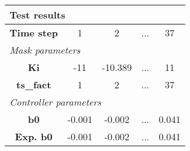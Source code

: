 \vspace{1em}
\begin{tabularx}{\textwidth}{|c|c|c|>{\centering\arraybackslash}X|c|}
\hline
\multicolumn{5}{|l|}{\cellcolor[gray]{0.8}\textbf{Test results}} \tabularnewline \hline
\textbf{Time step} & 1 & 2 & ... & 37 \tabularnewline \hline
\multicolumn{5}{|l|}{\cellcolor[gray]{0.9}\textit{Mask parameters}} \tabularnewline \hline
\textbf{Ki} & -11 & -10.389 & ... & 11 \tabularnewline \hline
\textbf{ts\_fact} & 1 & 2 & ... & 37 \tabularnewline \hline
\multicolumn{5}{|l|}{\cellcolor[gray]{0.9}\textit{Controller parameters}} \tabularnewline \hline
\textbf{b0} & -0.001 & -0.002 & ... & 0.041 \tabularnewline \hline
\textbf{Exp. b0} & -0.001 & -0.002 & ... & 0.041 \tabularnewline \hline
\end{tabularx}
\vspace{1ex}
